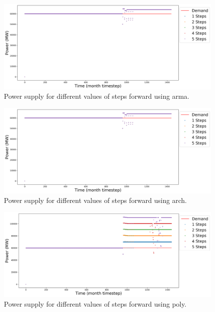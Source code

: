 \documentclass[11pt]{article}
\begin{document}
\begin{figure}[H]
	\centering
	\includegraphics[width=\textwidth]{29-figures/29-power-buffer0-arma-steps.png} 
	\hfill
	\caption{Power supply for different values of steps forward using arma.}
	\label{fig:29-ste-arma}
\end{figure}

\begin{figure}[H]
	\centering
	\includegraphics[width=\textwidth]{29-figures/29-power-buffer0-arch-steps.png} 
	\hfill
	\caption{Power supply for different values of steps forward using arch.}
	\label{fig:29-ste-arch}
\end{figure}

\begin{figure}[H]
	\centering
	\includegraphics[width=\textwidth]{29-figures/29-power-buffer0-poly-steps.png} 
	\hfill
	\caption{Power supply for different values of steps forward using poly.}
	\label{fig:29-ste-poly}
\end{figure}
\end{document}
